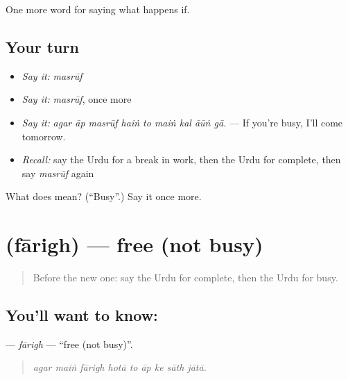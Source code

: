 \begin{grammarlens}[title={What you've built}]
One more word for saying what happens if.
\end{grammarlens}

\subsection*{Your turn}
\begin{itemize}
\raggedright
  \item \emph{Say it:} \emph{masrūf}
  \item \emph{Say it:} \emph{masrūf}, once more
  \item \emph{Say it:} \emph{agar āp masrūf haiṅ to maiṅ kal āūṅ gā.} — If you're busy, I'll come tomorrow.
  \item \emph{Recall:} say the Urdu for a break in work, then the Urdu for complete, then say \emph{masrūf} again
\end{itemize}

\begin{tcolorbox}[breakable,colback=teal!4,colframe=teal!35!black,title={Before you move on}]
What does  mean? (\textquotedblleft{}Busy\textquotedblright{}.) Say it once more.
\end{tcolorbox}
\section[\texorpdfstring{\ur{فارغ} (fārigh)}{فارغ (fārigh)}]{ (fārigh) — free (not busy)}

\label{lesson:UR-C527-farigh}



\begin{quote}
Before the new one: say the Urdu for complete, then the Urdu for busy.
\end{quote}

\subsection*{You'll want to know: }
\textbf{} — \emph{fārigh} — \textquotedblleft{}free (not busy)\textquotedblright{}.

\begin{quote}
        
\end{quote}

\begin{quote}
\emph{agar maiṅ fārigh hotā to āp ke sāth jātā.}
\end{quote}

